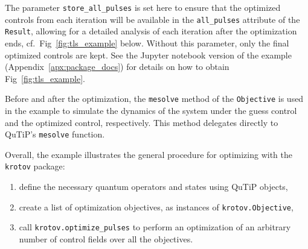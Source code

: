 \documentclass[submission, Phys]{SciPost}
\begin{document}
The parameter \texttt{store\_all\_pulses} is set here to ensure that the
optimized controls from each iteration will be available in the
\texttt{all\_pulses} attribute of the \texttt{Result},
allowing for a detailed analysis of each iteration after the optimization ends,
cf.~Fig~\ref{fig:tls_example} below.
Without this parameter, only the final optimized controls are kept.
See the Jupyter notebook version of the example
(Appendix~\ref{apx:package_docs}) for details on how to obtain
Fig~\ref{fig:tls_example}.

Before and after the optimization, the \texttt{mesolve} method of the
\texttt{Objective} is used in the example to simulate the dynamics of the system
under the guess control and the optimized control, respectively.
This method delegates directly to QuTiP's \texttt{mesolve} function.

Overall, the example illustrates the general procedure for optimizing with the
\texttt{krotov} package:
\begin{enumerate}
  \item
    define the necessary quantum operators and states using QuTiP objects,
  \item
    create a list of optimization objectives, as instances of
    \texttt{krotov.Objective}, \item call \texttt{krotov.optimize\_pulses} to
    perform an optimization of an arbitrary number of control fields over all
    the objectives.
\end{enumerate}
\end{document}
